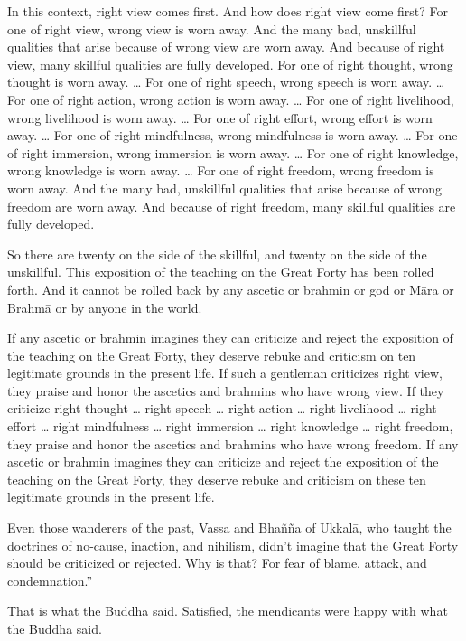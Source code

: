 \documentclass[12pt,openany]{book}%
\begin{document}
In this context, right view comes first. And how does right view come first? For one of right view, wrong view is worn away. And the many bad, unskillful qualities that arise because of wrong view are worn away. And because of right view, many skillful qualities are fully developed. For one of right thought, wrong thought is worn away. … For one of right speech, wrong speech is worn away. … For one of right action, wrong action is worn away. … For one of right livelihood, wrong livelihood is worn away. … For one of right effort, wrong effort is worn away. … For one of right mindfulness, wrong mindfulness is worn away. … For one of right immersion, wrong immersion is worn away. … For one of right knowledge, wrong knowledge is worn away. … For one of right freedom, wrong freedom is worn away. And the many bad, unskillful qualities that arise because of wrong freedom are worn away. And because of right freedom, many skillful qualities are fully developed. 

So there are twenty on the side of the skillful, and twenty on the side of the unskillful. This exposition of the teaching on the Great Forty has been rolled forth. And it cannot be rolled back by any ascetic or brahmin or god or \textsanskrit{Māra} or \textsanskrit{Brahmā} or by anyone in the world. 

If any ascetic or brahmin imagines they can criticize and reject the exposition of the teaching on the Great Forty, they deserve rebuke and criticism on ten legitimate grounds in the present life. If such a gentleman criticizes right view, they praise and honor the ascetics and brahmins who have wrong view. If they criticize right thought … right speech … right action … right livelihood … right effort … right mindfulness … right immersion … right knowledge … right freedom, they praise and honor the ascetics and brahmins who have wrong freedom. If any ascetic or brahmin imagines they can criticize and reject the exposition of the teaching on the Great Forty, they deserve rebuke and criticism on these ten legitimate grounds in the present life. 

Even those wanderers of the past, Vassa and \textsanskrit{Bhañña} of \textsanskrit{Ukkalā}, who taught the doctrines of no-cause, inaction, and nihilism, didn’t imagine that the Great Forty should be criticized or rejected. Why is that? For fear of blame, attack, and condemnation.” 

That is what the Buddha said. Satisfied, the mendicants were happy with what the Buddha said. 
\end{document}
